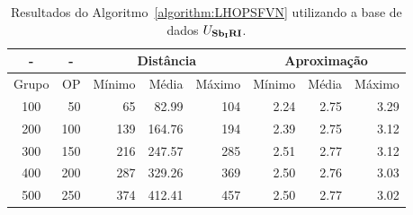 \begin{table}[!htb]
  \caption{Resultados do Algoritmo~\ref{algorithm:LHOPSFVN} utilizando a base de dados $U_{\textbf{Sb\textsubscript{I}RI}}{}$.}
  \label{table:UIARBECI}
  \centering
  \begin{tabular}{|c|r|r|r|r|r|r|r|}
    \hline
      -      & \multicolumn{1}{c|}{-} & \multicolumn{3}{c|}{Distância}             & \multicolumn{3}{c|}{Aproximação}           \\ \hline
    Grupo    & OP                     & Mínimo       & Média        & Máximo       & Mínimo       & Média        & Máximo       \\ \hline  
    100      & 50                     & 65           & 82.99        & 104          & 2.24         & 2.75         & 3.29         \\ \hline
    200      & 100                    & 139          & 164.76       & 194          & 2.39         & 2.75         & 3.12         \\ \hline
    300      & 150                    & 216          & 247.57       & 285          & 2.51         & 2.77         & 3.12         \\ \hline
    400      & 200                    & 287          & 329.26       & 369          & 2.50         & 2.76         & 3.03         \\ \hline
    500      & 250                    & 374          & 412.41       & 457          & 2.50         & 2.77         & 3.02         \\ \hline    
  \end{tabular}
\end{table}